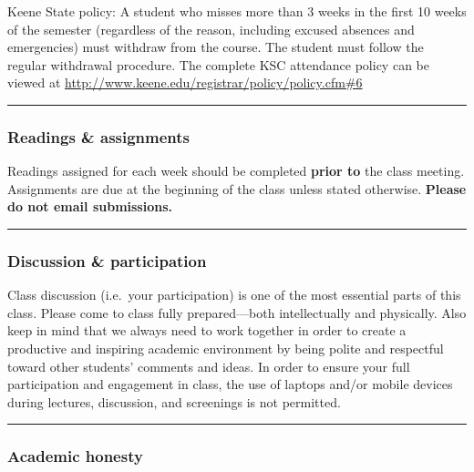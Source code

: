 \documentclass[]{tufte-handout}
\begin{document}
Keene State policy: A student who misses more than 3 weeks in the first
10 weeks of the semester (regardless of the reason, including excused
absences and emergencies) must withdraw from the course. The student
must follow the regular withdrawal procedure. The complete KSC
attendance policy can be viewed at
\url{http://www.keene.edu/registrar/policy/policy.cfm\#6}

\begin{center}\rule{0.5\linewidth}{0.5pt}\end{center}

\hypertarget{readings-assignments}{%
\subsubsection{Readings \& assignments}\label{readings-assignments}}

Readings assigned for each week should be completed \textbf{prior to}
the class meeting. Assignments are due at the beginning of the class
unless stated otherwise. \textbf{Please do not email submissions.}

\begin{center}\rule{0.5\linewidth}{0.5pt}\end{center}

\hypertarget{discussion-participation}{%
\subsubsection{Discussion \&
participation}\label{discussion-participation}}

Class discussion (i.e.~your participation) is one of the most essential
parts of this class. Please come to class fully prepared---both
intellectually and physically. Also keep in mind that we always need to
work together in order to create a productive and inspiring academic
environment by being polite and respectful toward other students'
comments and ideas. In order to ensure your full participation and
engagement in class, the use of laptops and/or mobile devices during
lectures, discussion, and screenings is not permitted.

\begin{center}\rule{0.5\linewidth}{0.5pt}\end{center}

\hypertarget{academic-honesty}{%
\subsubsection{Academic honesty}\label{academic-honesty}}
\end{document}
